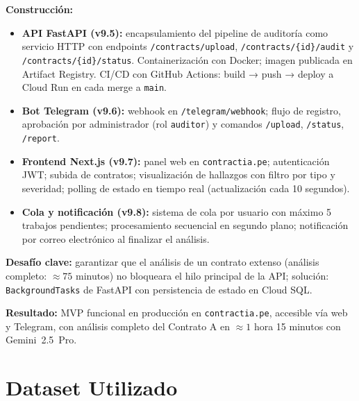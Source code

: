 \textbf{Construcción:}
\begin{itemize}
    \item \textbf{API FastAPI (v9.5):} encapsulamiento del pipeline de
    auditoría como servicio HTTP con endpoints \texttt{/contracts/upload},
    \texttt{/contracts/\{id\}/audit} y \texttt{/contracts/\{id\}/status}.
    Containerización con Docker; imagen publicada en Artifact Registry.
    CI/CD con GitHub Actions: build → push → deploy a Cloud Run en cada
    merge a \texttt{main}.
    \item \textbf{Bot Telegram (v9.6):} webhook en \texttt{/telegram/webhook};
    flujo de registro, aprobación por administrador (rol \texttt{auditor})
    y comandos \texttt{/upload}, \texttt{/status}, \texttt{/report}.
    \item \textbf{Frontend Next.js (v9.7):} panel web en
    \texttt{contractia.pe}; autenticación JWT; subida de contratos;
    visualización de hallazgos con filtro por tipo y severidad;
    polling de estado en tiempo real (actualización cada 10 segundos).
    \item \textbf{Cola y notificación (v9.8):} sistema de cola por usuario
    con máximo 5 trabajos pendientes; procesamiento secuencial en segundo
    plano; notificación por correo electrónico al finalizar el análisis.
\end{itemize}

\textbf{Desafío clave:} garantizar que el análisis de un contrato extenso
(análisis completo: $\approx 75$ minutos) no bloqueara el hilo principal
de la API; solución: \texttt{BackgroundTasks} de FastAPI con persistencia
de estado en Cloud SQL.

\textbf{Resultado:} MVP funcional en producción en \texttt{contractia.pe},
accesible vía web y Telegram, con análisis completo del Contrato A
en $\approx 1$ hora 15 minutos con Gemini~2.5~Pro.

\section{Dataset Utilizado}


